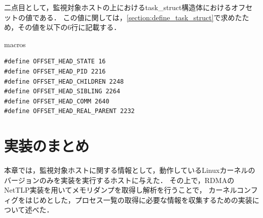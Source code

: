 二点目として，監視対象ホストの上におけるtask\_struct構造体におけるオフセットの値である．
この値に関しては，\ref{section:define_task_struct}で求めたため，その値を以下の6行に記載する．

\begin{itembox}[l]{macros}
    \begin{verbatim}
#define OFFSET_HEAD_STATE 16
#define OFFSET_HEAD_PID 2216
#define OFFSET_HEAD_CHILDREN 2248
#define OFFSET_HEAD_SIBLING 2264
#define OFFSET_HEAD_COMM 2640
#define OFFSET_HEAD_REAL_PARENT 2232
    \end{verbatim}
\end{itembox}

\section{実装のまとめ}


本章では，監視対象ホストに関する情報として，動作しているLinuxカーネルのバージョンのみを実装を実行するホストに与えた．
その上で，RDMAのNetTLP実装を用いてメモリダンプを取得し解析を行うことで，
カーネルコンフィグをはじめとした，プロセス一覧の取得に必要な情報を収集するための実装について述べた．
